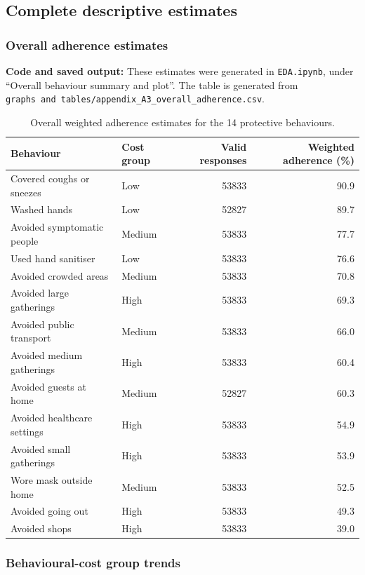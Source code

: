 \documentclass[
  12pt,
  a4paper,
]{article}
\begin{document}
\subsection{Complete descriptive estimates}\label{complete-descriptive-estimates}

\subsubsection{Overall adherence estimates}\label{overall-adherence-estimates}

\textbf{Code and saved output:} These estimates were generated in
\texttt{EDA.ipynb}, under ``Overall behaviour summary and plot''. The table is
generated from \texttt{graphs\ and\ tables/appendix\_A3\_overall\_adherence.csv}.

\begin{longtable}[t]{llrr}
\caption{\label{tab:overall-adherence-appendix}Overall weighted adherence estimates for the 14 protective behaviours.}\\
\toprule
Behaviour & Cost group & Valid responses & Weighted adherence (\%)\\
\midrule
Covered coughs or sneezes & Low & 53833 & 90.9\\
Washed hands & Low & 52827 & 89.7\\
Avoided symptomatic people & Medium & 53833 & 77.7\\
Used hand sanitiser & Low & 53833 & 76.6\\
Avoided crowded areas & Medium & 53833 & 70.8\\
\addlinespace
Avoided large gatherings & High & 53833 & 69.3\\
Avoided public transport & Medium & 53833 & 66.0\\
Avoided medium gatherings & High & 53833 & 60.4\\
Avoided guests at home & Medium & 52827 & 60.3\\
Avoided healthcare settings & High & 53833 & 54.9\\
\addlinespace
Avoided small gatherings & High & 53833 & 53.9\\
Wore mask outside home & Medium & 53833 & 52.5\\
Avoided going out & High & 53833 & 49.3\\
Avoided shops & High & 53833 & 39.0\\
\bottomrule
\end{longtable}

\subsubsection{Behavioural-cost group trends}\label{behavioural-cost-group-trends}
\end{document}
